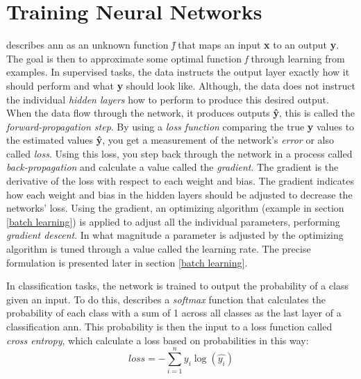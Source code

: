 \section{Training Neural Networks} \label{training neural networks}
    \citeauthor{Goodfellow-et-al-2016_NN}\cite{Goodfellow-et-al-2016_NN} describes \gls{ann} as an unknown function \textit{\^{f}} that maps an input \textbf{x} to an output \textbf{y}. The goal is then to approximate some optimal function \textit{f} through learning from examples. In supervised tasks, the data instructs the output layer exactly how it should perform and what \textbf{y} should look like. Although, the data does not instruct the individual \textit{hidden layers} how to perform to produce this desired output. When the data flow through the network, it produces outputs \textbf{\^{y}}, this is called the \textit{forward-propagation step}. By using a \textit{loss function} comparing the true \textbf{y} values to the estimated values \textbf{\^{y}}, you get a measurement of the network's \textit{error} or also called \textit{loss}. Using this loss, you step back through the network in a process called \textit{back-propagation} and calculate a value called the \textit{gradient}. The gradient is the derivative of the loss with respect to each weight and bias\cite{rumelhart1986learning_backprop}. The gradient indicates how each weight and bias in the hidden layers should be adjusted to decrease the networks' loss. Using the gradient, an optimizing algorithm (example in section \ref{batch learning}) is applied to adjust all the individual parameters, performing \textit{gradient descent}\cite{Goodfellow-et-al-2016_gradient_descent}. In what magnitude a parameter is adjusted by the optimizing algorithm is tuned through a value called the learning rate. The precise formulation is presented later in section \ref{batch learning}.
    
    In classification tasks, the network is trained to output the probability of a class given an input. To do this, \citeauthor{zhou2019mpce_cross_entropy}\cite{zhou2019mpce_cross_entropy} describes a \textit{softmax} function that calculates the probability of each class with a sum of 1 across all classes as the last layer of a classification \gls{ann}. This probability is then the input to a loss function called \textit{cross entropy}, which calculate a loss based on probabilities in this way:
        \begin{equation} \label{cross_entropy}
            loss = - \sum^{n}_{i=1} y_{i}\log(\hat{y_{i}})
        \end{equation}
    
